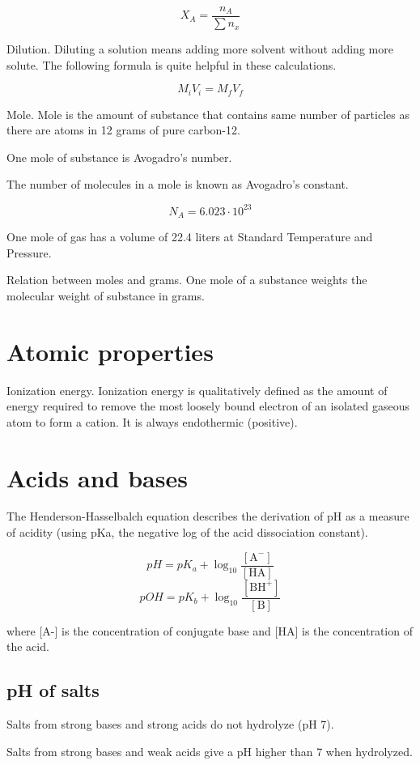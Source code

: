 \documentclass[12pt, oneside]{book}
\begin{document}
\[X_A = \frac{n_A}{\sum{n_x}}\]

Dilution. Diluting a solution means adding more solvent without adding more
solute.
The following formula is quite helpful in these calculations.

\[M_i V_i = M_f V_f\]

Mole. Mole is the amount of substance that contains same number of particles as
there are atoms in 12 grams of pure carbon-12.

One mole of substance is Avogadro's number.

The number of molecules in a mole is known as Avogadro's constant.

\[N_A = 6.023 \cdot 10^{23}\]

One mole of gas has a volume of 22.4 liters at Standard Temperature and
Pressure.

Relation between moles and grams.
One mole of a substance weights the molecular weight of substance in grams.

\chapter{Atomic properties}

Ionization energy. Ionization energy is qualitatively defined as the amount of
energy required to remove the most loosely bound electron of an isolated
gaseous atom to form a cation. It is always endothermic (positive).

\chapter{Acids and bases}

The Henderson-Hasselbalch equation describes the derivation of pH as a
measure of acidity (using pKa, the negative log of the acid dissociation
constant).

\[pH = pK_a + \log_{10} \frac{[\text{A}^-]}{[\text{HA}]}\]
\[pOH = pK_b + \log_{10} \frac{[\text{BH}^+]}{[\text{B}]}\]

where [A-] is the concentration of conjugate base and [HA] is the concentration
of the acid.

\section{pH of salts}
Salts from strong bases and strong acids do not hydrolyze (pH 7).

Salts from strong bases and weak acids give a pH higher than 7 when hydrolyzed.
\end{document}
